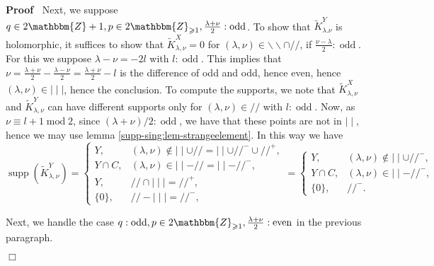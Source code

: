 \documentclass{article}
\newcommand{\nin}{\not\in}
\newcommand{\tmop}[1]{\ensuremath{\operatorname{#1}}}
\renewenvironment{proof}{\noindent\textbf{Proof\ }}{\hspace*{\fill}$\Box$\medskip}
\theoremstyle{remark}
\begin{document}
\begin{proof}
  Next, we suppose $q \in 2\mathbbm{Z}+ 1, p \in 2\mathbbm{Z}_{\geqslant 1},
  \frac{\lambda + \nu}{2} : \tmop{odd}$. To show that $\tilde{K}_{\lambda .
  \nu}^Y$ is holomorphic, it suffices to show that $\tilde{K}_{\lambda, \nu}^X
  = 0$ for $(\lambda, \nu) \in \backslash\backslash \cap / /$, if $\frac{\nu -
  \lambda}{2} : \tmop{odd}$. For this we suppose $\lambda - \nu = - 2 l$ with
  $l : \tmop{odd}$. This implies that $\nu = \frac{\lambda + \nu}{2} -
  \frac{\lambda - \nu}{2} = \frac{\lambda + \nu}{2} - l$ is the difference of
  odd and odd, hence even, hence $(\lambda, \nu) \in \mid \mid \mid$, hence
  the conclusion. To compute the supports, we note that $\tilde{K}_{\lambda,
  \nu}^X$ and $\tilde{K}_{\lambda, \nu}^Y$ can have different supports only
  for $(\lambda, \nu) \in / /$ with $l : \tmop{odd}$. Now, as $\nu \equiv l +
  1 \tmop{mod} 2$, since $(\lambda + \nu) / 2 : \tmop{odd}$, we have that
  these points are not in $\mid \mid$, hence we may use lemma
  \ref{supp-sing:lem-strangeelement}. In this way we have
  \[ \tmop{supp} (\tilde{K}_{\lambda, \nu}^Y) = \left\{ \begin{array}{ll}
       Y, & (\lambda, \nu) \nin \mid \mid \cup / / = \mid \mid \cup / /^- \cup
       / /^+,\\
       Y \cap C, & (\lambda, \nu) \in \mid \mid - / / = \mid \mid - / /^-,\\
       Y, & / / \cap \mid \mid \mid = / /^+,\\
       \{ 0 \}, & / / - \mid \mid \mid = / /^-,
     \end{array} \right. = \left\{ \begin{array}{ll}
       Y, & (\lambda, \nu) \nin \mid \mid \cup / /^-,\\
       Y \cap C, & (\lambda, \nu) \in \mid \mid - / /^-,\\
       \{ 0 \}, & / /^- .
     \end{array} \right. \]
  
  
  Next, we handle the case $q : \tmop{odd}, p \in 2\mathbbm{Z}_{\geqslant 1},
  \frac{\lambda + \nu}{2} : \tmop{even}$ in the previous paragraph.
  

\end{proof}
\end{document}
